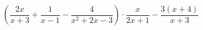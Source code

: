 \begin{ex}[type=expression]
	\begin{condition}
		\(\left( \dfrac{2x}{x+3}+\dfrac{1}{x-1}-\dfrac{4}{x^2+2x-3} \right)\cdot\dfrac{x}{2x+1}-\dfrac{3(x+4)}{x+3}\)
	\end{condition}
\end{ex}